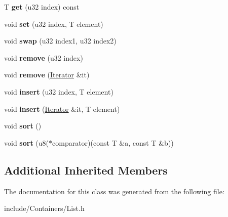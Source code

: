 \begin{DoxyCompactItemize}
\item 
T {\bfseries get} (u32 index) const \hypertarget{classDE_1_1List_ad2ea5f64a6f88b5f4143e4c71b5cad90}{}\label{classDE_1_1List_ad2ea5f64a6f88b5f4143e4c71b5cad90}

\item 
void {\bfseries set} (u32 index, T element)\hypertarget{classDE_1_1List_a5e08633adfca77bec7f47117120ac5fd}{}\label{classDE_1_1List_a5e08633adfca77bec7f47117120ac5fd}

\item 
void {\bfseries swap} (u32 index1, u32 index2)\hypertarget{classDE_1_1List_a0d06f7ac8784ecf3f15f1469b3bb29bc}{}\label{classDE_1_1List_a0d06f7ac8784ecf3f15f1469b3bb29bc}

\item 
void {\bfseries remove} (u32 index)\hypertarget{classDE_1_1List_ab70462cf280a4459adb6c837fa20a494}{}\label{classDE_1_1List_ab70462cf280a4459adb6c837fa20a494}

\item 
void {\bfseries remove} (\hyperlink{classDE_1_1List_1_1Iterator}{Iterator} \&it)\hypertarget{classDE_1_1List_a91c378ed012e468dfdeb9796206fd70b}{}\label{classDE_1_1List_a91c378ed012e468dfdeb9796206fd70b}

\item 
void {\bfseries insert} (u32 index, T element)\hypertarget{classDE_1_1List_a24ce2d78bf3b79b4258a153e8b5701e6}{}\label{classDE_1_1List_a24ce2d78bf3b79b4258a153e8b5701e6}

\item 
void {\bfseries insert} (\hyperlink{classDE_1_1List_1_1Iterator}{Iterator} \&it, T element)\hypertarget{classDE_1_1List_a57232c3aa2cacad5458d79b04d20409b}{}\label{classDE_1_1List_a57232c3aa2cacad5458d79b04d20409b}

\item 
void {\bfseries sort} ()\hypertarget{classDE_1_1List_ac2fbbfb7910777429b31e43a003bb73c}{}\label{classDE_1_1List_ac2fbbfb7910777429b31e43a003bb73c}

\item 
void {\bfseries sort} (u8($\ast$comparator)(const T \&a, const T \&b))\hypertarget{classDE_1_1List_aca8907fcbb0da2c0f4edc43e6c83d40c}{}\label{classDE_1_1List_aca8907fcbb0da2c0f4edc43e6c83d40c}

\end{DoxyCompactItemize}
\subsection*{Additional Inherited Members}


The documentation for this class was generated from the following file\+:\begin{DoxyCompactItemize}
\item 
include/\+Containers/List.\+h\end{DoxyCompactItemize}
